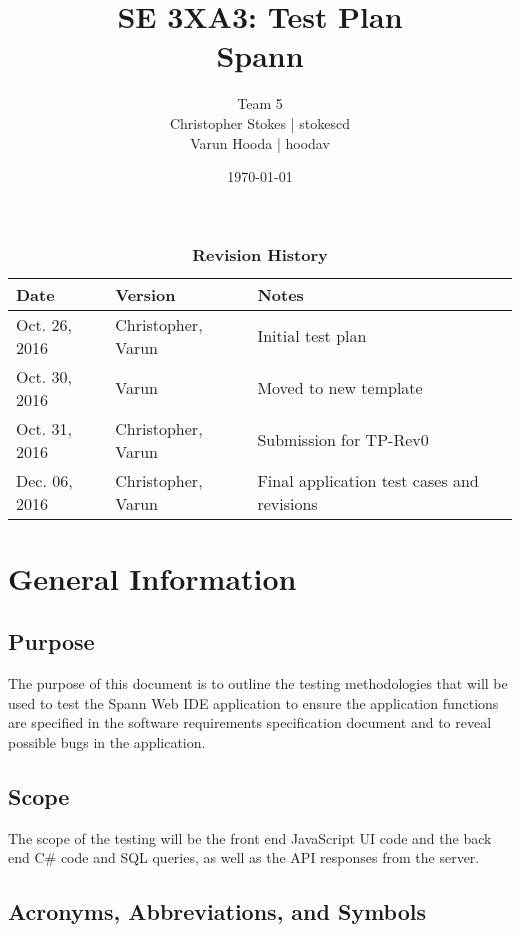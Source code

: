 \documentclass[12pt, titlepage]{article}
\title{SE 3XA3: Test Plan\\Spann}
\author{Team 5
		\\ Christopher Stokes | stokescd
		\\ Varun Hooda | hoodav
}
\date{\today}
\begin{document}
\maketitle

\tableofcontents
\listoftables

\begin{table}[bp]
\caption{\bf Revision History}
\begin{tabularx}{\textwidth}{p{3cm}p{2cm}X}
\toprule {\bf Date} & {\bf Version} & {\bf Notes}\\
\midrule
    Oct. 26, 2016 & Christopher, Varun & Initial test plan\\
    Oct. 30, 2016 & Varun & Moved to new template\\
    Oct. 31, 2016 & Christopher, Varun & Submission for TP-Rev0\\
		Dec. 06, 2016	& Christopher, Varun & Final application test cases and
			revisions\\
\bottomrule
\end{tabularx}
\end{table}

\newpage


\section{General Information}

    \subsection{Purpose}
    The purpose of this document is to outline the testing methodologies that will
    be used to test the Spann Web IDE application to ensure the application
    functions are specified in the software requirements specification document and
    to reveal possible bugs in the application.

    \subsection{Scope}
    The scope of the testing will be the front end JavaScript UI code and the back
    end C\# code and SQL queries, as well as the API responses from the server.

    \subsection{Acronyms, Abbreviations, and Symbols}
      
\end{document}
